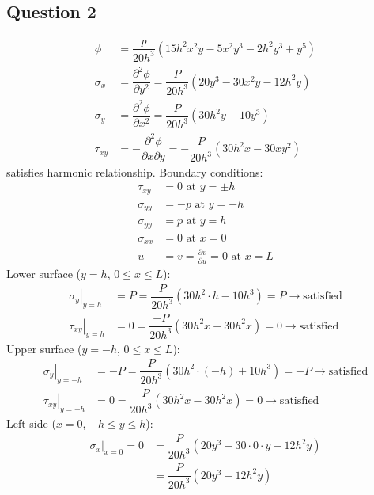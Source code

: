 \documentclass[11pt]{article}
\numberwithin{equation}{section}
\begin{document}
\subsection{Question 2}
\begin{align}
    \phi      & = \dfrac{p}{20h^3} \left(15h^2x^2y-5x^2y^3-2h^2y^3+y^5\right)                                    \\
    \sigma_x  & = \dfrac{\partial^2 \phi}{\partial y^2} = \dfrac{P}{20h^3}\left(20y^3 -30x^2y-12h^2y\right)      \\
    \sigma_y  & = \dfrac{\partial^2 \phi}{\partial x^2} = \dfrac{P}{20h^3}\left(30h^2y-10y^3\right)              \\
    \tau_{xy} & = -\dfrac{\partial^2 \phi}{\partial x\partial y} = - \dfrac{P}{20h^3} \left(30h^2x-30xy^2\right)
\end{align}
satisfies harmonic relationship. Boundary conditions:
\begin{align}
    \tau_{xy}   & = 0 \textrm{ at } y = \pm h                                 \\
    \sigma_{yy} & = -p \textrm{ at } y = -h                                   \\
    \sigma_{yy} & = p \textrm{ at } y = h                                     \\
    \sigma_{xx} & = 0 \textrm{ at } x = 0                                     \\
    u           & = v = \frac{\partial v}{\partial u} = 0 \textrm{ at } x = L
\end{align}
Lower surface ($ y = h$, $0 \leq x \leq L$):
\begin{align}
    \left. \sigma_y \right|_{y=h}  & = P = \dfrac{P}{20h^3}\left(30h^2\cdot h - 10h^3\right) = P \rightarrow \textrm{satisfied} \\
    \left. \tau_{xy} \right|_{y=h} & = 0 = \dfrac{-P}{20h^3}\left(30h^2x - 30h^2x\right) = 0 \rightarrow \textrm{satisfied}
\end{align}
Upper surface ($ y = - h$, $0 \leq x \leq L$):
\begin{align}
    \left. \sigma_y\right|_{y=-h}   & = -P = \dfrac{P}{20h^3}\left( 30h^2\cdot \left( -h\right)+10h^3\right) = -P \rightarrow \textrm{satisfied} \\
    \left. \tau_{xy} \right|_{y=-h} & = 0 = \dfrac{-P}{20h^3} \left( 30h^2x - 30h^2x \right) = 0 \rightarrow \textrm{satisfied}
\end{align}
Left side ($ x = 0$, $-h \leq y \leq h$):
\begin{align}
    \left. \sigma_x \right|_{x=0} = 0 & = \dfrac{P}{20h^3}\left(20y^3 - 30\cdot 0 \cdot y - 12h^2 y\right) \\
                                      & =  \dfrac{P}{20h^3}\left(20y^3 - 12h^2 y\right)
\end{align}
\end{document}
